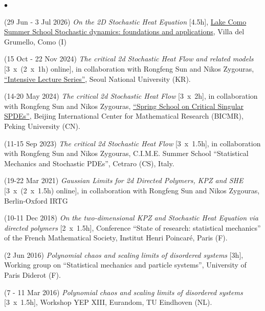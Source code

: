 \documentclass[a4paper,11pt,oneside]{amsart}
\newenvironment{myitemize}{%
\begin{list}{$\bullet$}%
 	{%
	\setlength{\itemsep}{0.3em}%
	\setlength{\topsep}{0.3em}%
	\setlength{\partopsep}{0em}%
	\setlength{\parsep}{0em}%
	\setlength{\parskip}{0em}%
	\setlength\leftmargin{1.5em}%
	\setlength\labelwidth{1.1em}%
	\setlength{\labelsep}{0.4em}%
	}%
	}%
{\end{list}}
\renewenvironment{itemize}{
\begin{myitemize}}%
{\end{myitemize}}
\begin{document}
\begin{itemize}
\item (29 Jun - 3 Jul 2026)
\emph{On the 2D Stochastic Heat Equation} [4.5h],
\href{https://sdfa.lakecomoschool.org/}{Lake Como Summer School Stochastic dynamics: foundations and applications},
Villa del Grumello, Como (I)

\item (15 Oct - 22 Nov 2024)
\emph{The critical 2d Stochastic Heat Flow and related models} 
[3~x~(2~x~1h) online],
in collaboration with Rongfeng Sun and Nikos Zygouras,
\href{https://sites.google.com/view/snuprob/seminar/intensive-lecture-series}{``Intensive Lecture Series''},
Seoul National University (KR).

\item (14-20 May 2024)
\emph{The critical 2d Stochastic Heat Flow} [3~x~2h],
in collaboration with Rongfeng Sun and Nikos Zygouras,
\href{https://bicmr.pku.edu.cn/content/show/17-3296.html}{``Spring School on Critical Singular SPDEs''},
Beijing International Center for Mathematical Research (BICMR),
Peking University (CN).

\item (11-15 Sep 2023)
\emph{The critical 2d Stochastic Heat Flow} [3~x~1.5h],
in collaboration with Rongfeng Sun and Nikos Zygouras,
C.I.M.E. Summer School ``Statistical Mechanics and Stochastic PDEs'',
Cetraro (CS), Italy.

\item (19-22 Mar 2021)
\emph{Gaussian Limits for 2d Directed Polymers, KPZ and SHE} [3~x~(2~x~1.5h) online],
in collaboration with Rongfeng Sun and Nikos Zygouras,
Berlin-Oxford IRTG 

\item (10-11 Dec 2018)
\emph{On the two-dimensional KPZ and Stochastic Heat Equation 
via directed polymers} [2~x~1.5h],
Conference
``State of research: statistical mechanics'' of the
French Mathematical Society, %
Institut Henri Poincar\'e, Paris (F).

\item (2 Jun 2016)
\emph{Polynomial chaos and scaling limits of disordered systems} [3h],
Working group on ``Statistical mechanics and particle systems'',
University of Paris Diderot (F).

\item (7 - 11 Mar 2016)
\emph{Polynomial chaos and scaling limits of disordered systems}
[3~x~1.5h],
Workshop YEP XIII, Eurandom, TU Eindhoven (NL).


\end{itemize}
\end{document}
